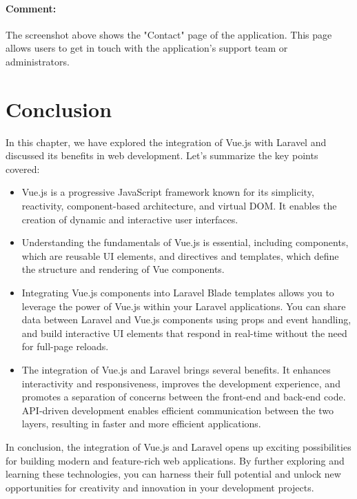 \begin{itemize}
\paragraph{Comment:} The screenshot above shows the "Contact" page of the application. This page allows users to get in touch with the application's support team or administrators.
\end{itemize}

\section{Conclusion}
In this chapter, we have explored the integration of Vue.js with Laravel and discussed its benefits in web development. Let's summarize the key points covered:
\begin{itemize}
    \item Vue.js is a progressive JavaScript framework known for its simplicity, reactivity, component-based architecture, and virtual DOM. It enables the creation of dynamic and interactive user interfaces.
    
    \item Understanding the fundamentals of Vue.js is essential, including components, which are reusable UI elements, and directives and templates, which define the structure and rendering of Vue components.

    \item Integrating Vue.js components into Laravel Blade templates allows you to leverage the power of Vue.js within your Laravel applications. You can share data between Laravel and Vue.js components using props and event handling, and build interactive UI elements that respond in real-time without the need for full-page reloads.

    \item The integration of Vue.js and Laravel brings several benefits. It enhances interactivity and responsiveness, improves the development experience, and promotes a separation of concerns between the front-end and back-end code. API-driven development enables efficient communication between the two layers, resulting in faster and more efficient applications.
\end{itemize}
In conclusion, the integration of Vue.js and Laravel opens up exciting possibilities for building modern and feature-rich web applications. By further exploring and learning these technologies, you can harness their full potential and unlock new opportunities for creativity and innovation in your development projects.
